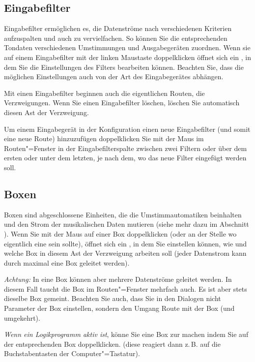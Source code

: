 {
\subsection{Eingabefilter}\label{sec:eingabefilter}

Eingabefilter ermöglichen es, die Datenströme nach verschiedenen Kriterien 
aufzuspalten und auch zu vervielfachen. So können Sie die entsprechenden 
Tondaten verschiedenen Umstimmungen und Ausgabegeräten zuordnen. 
Wenn sie auf einem Eingabefilter mit der linken Maustaste doppelklicken 
öffnet sich ein , in dem Sie die Einstellungen 
des Filters bearbeiten können. Beachten Sie, dass die möglichen 
Einstellungen auch von der Art des Eingabegerätes abhängen.


Mit einen Eingabefilter beginnen auch die eigentlichen Routen, 
die Verzweigungen. Wenn Sie einen Eingabefilter löschen, löschen 
Sie automatisch diesen Ast der Verzweigung.


Um einem Eingabegerät in der Konfiguration einen neue Eingabefilter 
(und somit eine neue Route) hinzuzufügen doppelklicken Sie 
mit der Maus im Routen"=Fenster in der Eingabefilterspalte zwischen 
zwei Filtern oder über dem ersten oder unter dem letzten, je 
nach dem, wo das neue Filter eingefügt werden soll.

\subsection{Boxen}\label{sec:boxen}


Boxen sind abgeschlossene Einheiten, die die Umstimmautomatiken 
beinhalten und den Strom der musikalischen Daten mutieren (siehe 
mehr dazu im Abschnitt ). Wenn Sie mit 
der Maus auf einer Box doppelklicken (oder an der Stelle wo eigentlich 
eine sein sollte), öffnet sich ein , in dem 
Sie einstellen können, wie und welche Box in diesem Ast der 
Verzweigung arbeiten soll (jeder Datenstrom kann durch maximal 
eine Box geleitet werden).


\emph{Achtung:} In eine Box können aber mehrere Datenströme 
geleitet werden. In diesem Fall taucht die Box im Routen"=Fenster 
mehrfach auch. Es ist aber stets dieselbe Box gemeint. Beachten 
Sie auch, dass Sie in den Dialogen nicht Parameter der Box einstellen, 
sondern den Umgang Route mit der Box (und umgekehrt).


\emph{Wenn ein Logikprogramm aktiv ist}, könne Sie eine Box 
zur  machen indem Sie auf der 
entsprechenden Box doppelklicken. (diese reagiert dann z.\,B. auf 
die Buchstabentasten der Computer"=Tastatur).

}
